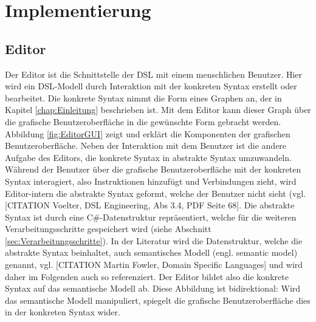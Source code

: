\chapter{Implementierung}
\label{chap:Implementierung}

\section{Editor}
\label{sec:Editor}
Der Editor ist die Schnittstelle der DSL mit einem menschlichen Benutzer. Hier wird ein DSL-Modell durch Interaktion mit der konkreten Syntax erstellt oder bearbeitet. Die konkrete Syntax nimmt die Form eines Graphen an, der in Kapitel \ref{chap:Einleitung} beschrieben ist. Mit dem Editor kann dieser Graph über die grafische Benutzeroberfläche in die gewünschte Form gebracht werden. Abbildung \ref{fig:EditorGUI} zeigt und erklärt die Komponenten der grafischen Benutzeroberfläche.
\newline 
Neben der Interaktion mit dem Benutzer ist die andere Aufgabe des Editors, die konkrete Syntax in abstrakte Syntax umzuwandeln. Während der Benutzer über die grafische Benutzeroberfläche mit der konkreten Syntax interagiert, also Instruktionen hinzufügt und Verbindungen zieht, wird Editor-intern die abstrakte Syntax geformt, welche der Benutzer nicht sieht (vgl. [CITATION Voelter, DSL Engineering, Abs 3.4, PDF Seite 68]. Die abstrakte Syntax ist durch eine C\#-Datenstruktur repräsentiert, welche für die weiteren Verarbeitungsschritte gespeichert wird (siehe Abschnitt \ref{sec:Verarbeitungsschritte}). In der Literatur wird die Datenstruktur, welche die abstrakte Syntax beinhaltet, auch semantisches Modell (engl. semantic model) genannt, vgl. [CITATION Martin Fowler, Domain Specific Languages] und wird daher im Folgenden auch so referenziert. Der Editor bildet also die konkrete Syntax auf das semantische Modell ab. Diese Abbildung ist bidirektional: Wird das semantische Modell manipuliert, spiegelt die grafische Benutzeroberfläche dies in der konkreten Syntax wider. 
\newline
